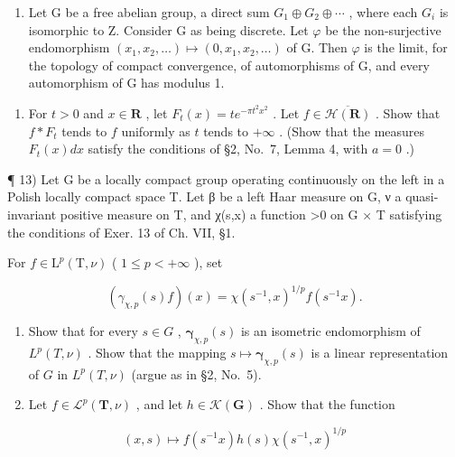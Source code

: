 \begin{enumerate}
\def\labelenumi{\alph{enumi})}
\setcounter{enumi}{1}
\tightlist
\item
  Let G be a free abelian group, a direct sum \(G_{1} \oplus G_{2} \oplus \cdots\) , where each \(G_{i}\) is isomorphic to Z. Consider G as being discrete. Let \(\varphi\) be the non-surjective endomorphism \((x_{1}, x_{2}, \ldots) \mapsto (0, x_{1}, x_{2}, \ldots)\) of G. Then \(\varphi\) is the limit, for the topology of compact convergence, of automorphisms of G, and every automorphism of G has modulus 1.
\end{enumerate}

\begin{enumerate}
\def\labelenumi{\arabic{enumi})}
\setcounter{enumi}{11}
\tightlist
\item
  For \(t > 0\) and \(x \in \mathbf{R}\) , let \(F_t(x) = te^{-\pi t^2 x^2}\) . Let \(f \in \overline{\mathcal{H}(\mathbf{R})}\) . Show that \(f * F_t\) tends to \(f\) uniformly as \(t\) tends to \(+\infty\) . (Show that the measures \(F_t(x) dx\) satisfy the conditions of §2, No.~7, Lemma 4, with \(a = 0\) .)
\end{enumerate}

¶ 13) Let G be a locally compact group operating continuously on the left in a Polish locally compact space T. Let β be a left Haar measure on G, ν a quasi-invariant positive measure on T, and χ(s,x) a function \textgreater0 on G × T satisfying the conditions of Exer. 13 of Ch. VII, §1.

For \(f \in \mathrm{L}^p(\mathrm{T}, \nu)\) ( \(1 \leqslant p < +\infty\) ), set

\[
\left(\gamma_ {\chi , p} (s) f\right) (x) = \chi (s ^ {- 1}, x) ^ {1 / p} f (s ^ {- 1} x).
\]

\begin{enumerate}
\def\labelenumi{\alph{enumi})}
\item
  Show that for every \(s \in G\) , \(\pmb{\gamma}_{\chi,p}(s)\) is an isometric endomorphism of \(L^p(T, \nu)\) . Show that the mapping \(s \mapsto \pmb{\gamma}_{\chi,p}(s)\) is a linear representation of \(G\) in \(L^p(T, \nu)\) (argue as in §2, No.~5).
\item
  Let \(f \in \mathcal{L}^p(\mathbf{T}, \nu)\) , and let \(h \in \mathcal{K}(\mathbf{G})\) . Show that the function
\end{enumerate}

\[
(x, s) \mapsto f (s ^ {- 1} x) h (s) \chi (s ^ {- 1}, x) ^ {1 / p}
\]

